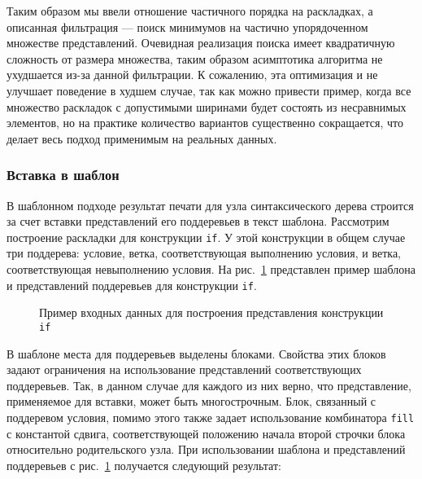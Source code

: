 Таким образом мы ввели отношение частичного порядка на раскладках, а
описанная фильтрация --- поиск минимумов на частично упорядоченном
множестве представлений\cite{poset}.
Очевидная реализация поиска имеет квадратичную сложность от размера множества,
таким образом асимптотика алгоритма не ухудшается из-за данной фильтрации.
К сожалению, эта оптимизация и не улучшает поведение
в худшем случае, так как
можно привести пример, когда все множество раскладок с допустимыми ширинами
будет состоять из несравнимых элементов, но на практике количество вариантов
существенно сокращается, что делает весь подход применимым на реальных данных.

\subsubsection{Вставка в шаблон}
\label{txt:templateInsert}

В шаблонном подходе результат печати для узла синтаксического дерева строится
за счет вставки представлений его поддеревьев в текст шаблона.
Рассмотрим построение раскладки для конструкции
\lstinline{if}. У этой конструкции в общем случае три поддерева: условие,
ветка, соответствующая выполнению условия, и ветка, соответствующая
невыполнению условия.
На рис.~\ref{fig:ifEx} представлен пример шаблона и представлений поддеревьев для
конструкции \lstinline{if}.

\begin{figure}[h!]
  \subfloat[Шаблон]{
    \makebox[0.15\textwidth]{
      \centering
      
    }
    \label{fig:ifTemplate}
  }
  \quad
  \subfloat[Условие]{
    \makebox[0.15\textwidth]{
      \centering
      
    }
    \label{fig:ifCond}
  }

  \caption{Пример входных данных для построения представления конструкции \lstinline{if}}
  \label{fig:ifEx}
\end{figure}

В шаблоне места для поддеревьев выделены блоками. Свойства этих блоков задают
ограничения на использование представлений соответствующих поддеревьев.
Так, в данном случае для каждого из них верно,
что представление, применяемое для вставки, может быть многострочным. Блок, связанный
с поддеревом условия, помимо этого также задает использование комбинатора
\lstinline{fill} с константой сдвига, соответствующей положению начала
второй строчки блока относительно родительского узла.
При использовании шаблона и представлений
поддеревьев с рис.~\ref{fig:ifEx} получается следующий результат:

